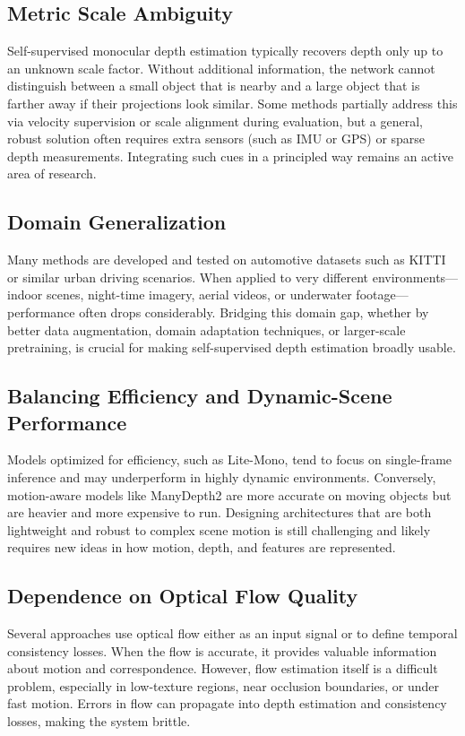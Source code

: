 \documentclass[10pt,twocolumn,letterpaper]{article}
\begin{document}
\subsection{Metric Scale Ambiguity}

Self-supervised monocular depth estimation typically recovers depth only up to an unknown scale factor. Without additional information, the network cannot distinguish between a small object that is nearby and a large object that is farther away if their projections look similar. Some methods partially address this via velocity supervision or scale alignment during evaluation, but a general, robust solution often requires extra sensors (such as IMU or GPS) or sparse depth measurements. Integrating such cues in a principled way remains an active area of research.

\subsection{Domain Generalization}

Many methods are developed and tested on automotive datasets such as KITTI or similar urban driving scenarios. When applied to very different environments—indoor scenes, night-time imagery, aerial videos, or underwater footage—performance often drops considerably. Bridging this domain gap, whether by better data augmentation, domain adaptation techniques, or larger-scale pretraining, is crucial for making self-supervised depth estimation broadly usable.

\subsection{Balancing Efficiency and Dynamic-Scene Performance}

Models optimized for efficiency, such as Lite-Mono, tend to focus on single-frame inference and may underperform in highly dynamic environments. Conversely, motion-aware models like ManyDepth2 are more accurate on moving objects but are heavier and more expensive to run. Designing architectures that are both lightweight and robust to complex scene motion is still challenging and likely requires new ideas in how motion, depth, and features are represented.

\subsection{Dependence on Optical Flow Quality}

Several approaches use optical flow either as an input signal or to define temporal consistency losses. When the flow is accurate, it provides valuable information about motion and correspondence. However, flow estimation itself is a difficult problem, especially in low-texture regions, near occlusion boundaries, or under fast motion. Errors in flow can propagate into depth estimation and consistency losses, making the system brittle.
\end{document}
